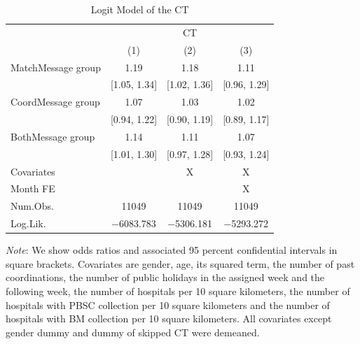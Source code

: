 \documentclass[12pt, a4paper]{article}
\begin{document}
\begin{table}[H]

\caption{\label{tab:logit-test}Logit Model of the CT}
\centering
\fontsize{8}{10}\selectfont
\begin{threeparttable}
\begin{tabular}[t]{>{\raggedright\arraybackslash}p{20em}ccc}
\toprule
\multicolumn{1}{c}{ } & \multicolumn{3}{c}{CT} \\
\cmidrule(l{3pt}r{3pt}){2-4}
  & (1) & (2) & (3)\\
\midrule
MatchMessage group & \num{1.19} & \num{1.18} & \num{1.11}\\
 & {}[\num{1.05}, \num{1.34}] & {}[\num{1.02}, \num{1.36}] & {}[\num{0.96}, \num{1.29}]\\
CoordMessage group & \num{1.07} & \num{1.03} & \num{1.02}\\
 & {}[\num{0.94}, \num{1.22}] & {}[\num{0.90}, \num{1.19}] & {}[\num{0.89}, \num{1.17}]\\
BothMessage group & \num{1.14} & \num{1.11} & \num{1.07}\\
 & {}[\num{1.01}, \num{1.30}] & {}[\num{0.97}, \num{1.28}] & {}[\num{0.93}, \num{1.24}]\\
\midrule
Covariates &  & X & X\\
Month FE &  &  & X\\
Num.Obs. & \num{11049} & \num{11049} & \num{11049}\\
Log.Lik. & \num{-6083.783} & \num{-5306.181} & \num{-5293.272}\\
\bottomrule
\end{tabular}
\begin{tablenotes}
\item \emph{Note}: We show odds ratios and associated 95 percent confidential intervals in square brackets. Covariates are gender, age, its squared term, the number of past coordinations, the number of public holidays in the assigned week and the following week, the number of hospitals per 10 square kilometers, the number of hospitals with PBSC collection per 10 square kilometers and the number of hospitals with BM collection per 10 square kilometers. All covariates except gender dummy and dummy of skipped CT were demeaned.
\end{tablenotes}
\end{threeparttable}
\end{table}
\end{document}
